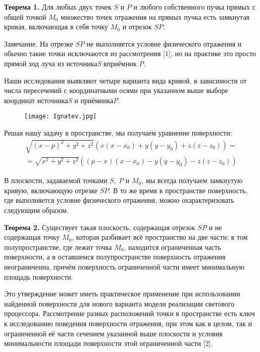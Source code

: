 \textbf{Теорема 1.}
Для любых двух точек $S$ и $P$ и любого собственного пучка прямых с общей точкой $M_0$ множество точек отражения на прямых пучка есть замкнутая кривая, включающая в себя точку $M_0$ и отрезок $SP$.

Замечание. На отрезке $SP$ не выполняется условие физического отражения и обычно такие точки исключаются из рассмотрения [1], но на практике это просто прямой ход луча из источника\textit{S} вприёмник \textit{P}.

Наши исследования выявляют четыре варианта вида кривой, в зависимости от числа пересечений с координатными осями при указанном выше выборе координат источника\textit{S} и приёмника\textit{P}.

\begin{figure}
	\centering
	\texttt{[image: Ignatev.jpg]}
\end{figure}

Решая нашу задачу в пространстве, мы получаем уравнение поверхности:
%
\begin{multline*}
	\sqrt{{\left(x-p\right)}^2+y^2+z^2}\left(x\left(x-x_0\right)+y\left(y-y_0\right)+z\left(z-z_0\right)\right)=
	\\=
	\sqrt{x^2+y^2+z^2}\left(\left(p-x\right)\left(x-x_0\right)-y\left(y-y_0\right)-z\left(z-z_0\right)\right)
\end{multline*}

В плоскости, задаваемой точками $S,\ P$ и $M_0$, мы всегда получаем замкнутую кривую, включающую отрезке $SP$. В то же время в пространстве поверхность, где выполняется условие физического отражения, можно охарактеризовать следующим образом.

\textbf{Теорема 2.}  Существует такая плоскость, содержащая отрезок $SP$ и не содержащая точку $M_0$, которая разбивает всё пространство на две части: в том полупространстве, где лежит точка $M_0$, находится ограниченная часть поверхности, а в оставшемся полупространстве поверхность отражения неограниченна, причём поверхность ограниченной части имеет минимальную площадь поверхности.

Это утверждение может иметь практическое применение при использовании найденной поверхности
для нового варианта модели реализации светового процессора.
Рассмотрение разных
\linebreak
расположений точки в пространстве есть ключ к исследованию поведения поверхности отражения,
при этом как в целом, так и ограниченной её части сечением указанной выше плоскости
и условия минимальности площади поверхности этой ограниченной части [2].


